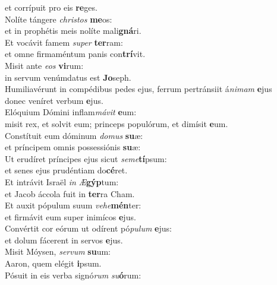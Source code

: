 \evenverse et corrípuit pro eis \textbf{re}ges.\\
\oddverse Nolíte tángere \textit{chri}\textit{stos} \textbf{me}os:~\*\\
\oddverse et in prophétis meis nolíte mali\textbf{gná}ri.\\
\evenverse Et vocávit famem \textit{su}\textit{per} \textbf{ter}ram:~\*\\
\evenverse et omne firmaméntum panis con\textbf{trí}vit.\\
\oddverse Misit ante \textit{e}\textit{os} \textbf{vi}rum:~\*\\
\oddverse in servum venúmdatus est \textbf{Jo}seph.\\
\evenverse Humiliavérunt in compédibus pedes ejus, ferrum pertránsiit á\textit{ni}\textit{mam} \textbf{e}jus~\*\\
\evenverse donec veníret verbum \textbf{e}jus.\\
\oddverse Elóquium Dómini inflam\textit{má}\textit{vit} \textbf{e}um:~\*\\
\oddverse misit rex, et solvit eum; princeps populórum, et dimísit \textbf{e}um.\\
\evenverse Constítuit eum dóminum \textit{do}\textit{mus} \textbf{su}æ:~\*\\
\evenverse et príncipem omnis possessiónis \textbf{su}æ:\\
\oddverse Ut erudíret príncipes ejus sicut \textit{se}\textit{me}\textbf{tí}psum:~\*\\
\oddverse et senes ejus prudéntiam do\textbf{cé}ret.\\
\evenverse Et intrávit Israël \textit{in} \textit{Æ}\textbf{gýp}tum:~\*\\
\evenverse et Jacob áccola fuit in \textbf{ter}ra Cham.\\
\oddverse Et auxit pópulum suum \textit{ve}\textit{he}\textbf{mén}ter:~\*\\
\oddverse et firmávit eum super inimícos \textbf{e}jus.\\
\evenverse Convértit cor eórum ut odírent pó\textit{pu}\textit{lum} \textbf{e}jus:~\*\\
\evenverse et dolum fácerent in servos \textbf{e}jus.\\
\oddverse Misit Móysen, \textit{ser}\textit{vum} \textbf{su}um:~\*\\
\oddverse Aaron, quem elégit \textbf{i}psum.\\
\evenverse Pósuit in eis verba signó\textit{rum} \textit{su}\textbf{ó}rum:~\*\\
